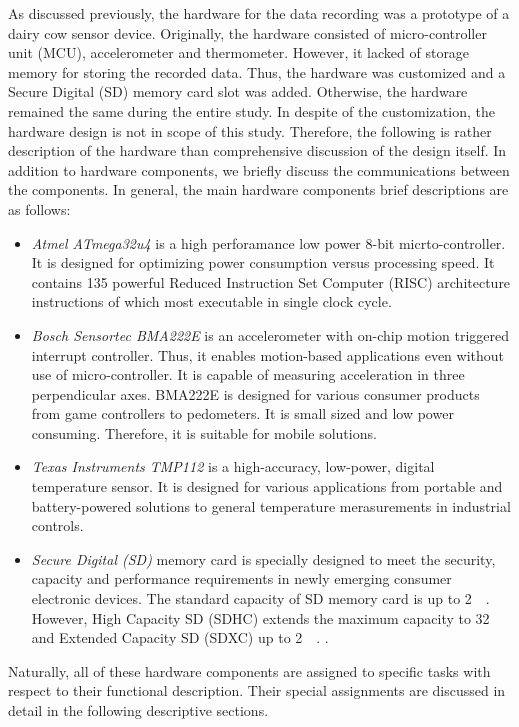\documentclass[english,12pt,a4paper,pdftex,elec,utf8]{aaltothesis}
\begin{document}
As discussed previously, the hardware for the data recording was a prototype of a dairy cow sensor device. Originally, the hardware consisted of micro-controller unit (MCU), accelerometer and thermometer. However, it lacked of storage memory for storing the recorded data. Thus, the hardware was customized and a Secure Digital (SD) memory card slot was added. Otherwise, the hardware remained the same during the entire study. In despite of the customization, the hardware design is not in scope of this study. Therefore, the following is rather description of the hardware than comprehensive discussion of the design itself. In addition to hardware components, we briefly discuss the communications between the components. In general, the main hardware components brief descriptions are as follows:

\begin{itemize}
\item \textit{Atmel ATmega32u4} is a high perforamance low power 8-bit micrto-controller. It is designed for optimizing power consumption versus processing speed. It contains 135 powerful Reduced Instruction Set Computer (RISC) architecture instructions of which most executable in single clock cycle.  \cite{atmega32u4datasheet} 


\item \textit{Bosch Sensortec BMA222E} is an accelerometer with on-chip motion triggered interrupt controller. Thus, it enables motion-based applications even without use of micro-controller. It is capable of measuring acceleration in three perpendicular axes. BMA222E is designed for various consumer products from game controllers to pedometers. It is small sized and low power consuming. Therefore, it is suitable for mobile solutions.  \cite{bma222datasheet} 

\item \textit{Texas Instruments TMP112} is a high-accuracy, low-power, digital temperature sensor. It is designed for various applications from portable and battery-powered solutions to general temperature merasurements in industrial controls. \cite{tmp112datasheet} 

\item \textit{Secure Digital (SD)} memory card is specially designed to meet the security, capacity and performance requirements in newly emerging consumer electronic devices. The standard capacity of SD memory card is up to \SI{2}{\giga\byte}. However, High Capacity SD (SDHC) extends the maximum capacity to \SI{32}{\giga\byte} and Extended Capacity SD (SDXC) up to \SI{2}{\tera\byte}. \cite{sdspecification}.

\end{itemize} Naturally, all of these hardware components are assigned to specific tasks with respect to their functional description. Their special assignments are discussed in detail in the following descriptive sections.
\end{document}
